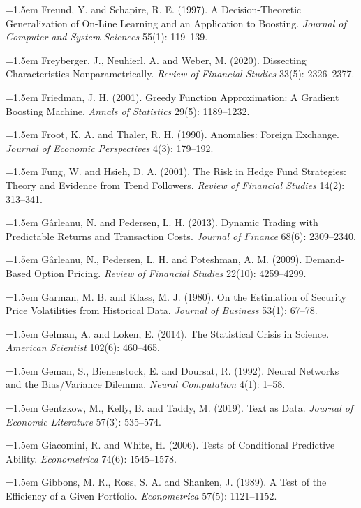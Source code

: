 \hangindent=1.5em Freund, Y. and Schapire, R. E. (1997). A Decision-Theoretic Generalization of On-Line Learning and an Application to Boosting. \emph{Journal of Computer and System Sciences} 55(1): 119--139.

\hangindent=1.5em Freyberger, J., Neuhierl, A. and Weber, M. (2020). Dissecting Characteristics Nonparametrically. \emph{Review of Financial Studies} 33(5): 2326--2377.

\hangindent=1.5em Friedman, J. H. (2001). Greedy Function Approximation: A Gradient Boosting Machine. \emph{Annals of Statistics} 29(5): 1189--1232.

\hangindent=1.5em Froot, K. A. and Thaler, R. H. (1990). Anomalies: Foreign Exchange. \emph{Journal of Economic Perspectives} 4(3): 179--192.

\hangindent=1.5em Fung, W. and Hsieh, D. A. (2001). The Risk in Hedge Fund Strategies: Theory and Evidence from Trend Followers. \emph{Review of Financial Studies} 14(2): 313--341.

\hangindent=1.5em G\^arleanu, N. and Pedersen, L. H. (2013). Dynamic Trading with Predictable Returns and Transaction Costs. \emph{Journal of Finance} 68(6): 2309--2340.

\hangindent=1.5em G\^arleanu, N., Pedersen, L. H. and Poteshman, A. M. (2009). Demand-Based Option Pricing. \emph{Review of Financial Studies} 22(10): 4259--4299.

\hangindent=1.5em Garman, M. B. and Klass, M. J. (1980). On the Estimation of Security Price Volatilities from Historical Data. \emph{Journal of Business} 53(1): 67--78.

\hangindent=1.5em Gelman, A. and Loken, E. (2014). The Statistical Crisis in Science. \emph{American Scientist} 102(6): 460--465.

\hangindent=1.5em Geman, S., Bienenstock, E. and Doursat, R. (1992). Neural Networks and the Bias/Variance Dilemma. \emph{Neural Computation} 4(1): 1--58.

\hangindent=1.5em Gentzkow, M., Kelly, B. and Taddy, M. (2019). Text as Data. \emph{Journal of Economic Literature} 57(3): 535--574.

\hangindent=1.5em Giacomini, R. and White, H. (2006). Tests of Conditional Predictive Ability. \emph{Econometrica} 74(6): 1545--1578.

\hangindent=1.5em Gibbons, M. R., Ross, S. A. and Shanken, J. (1989). A Test of the Efficiency of a Given Portfolio. \emph{Econometrica} 57(5): 1121--1152.

